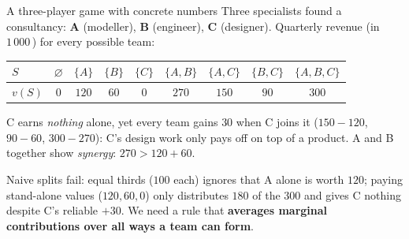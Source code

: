\documentclass[aspectratio=169,11pt]{beamer}
\begin{document}
\begin{frame}{A three-player game with concrete numbers}
  Three specialists found a consultancy: \textbf{A} (modeller), \textbf{B}
  (engineer), \textbf{C} (designer). Quarterly revenue (in $1\,000$\,\texteuro)
  for every possible team:
  \begin{numexample}
    \begin{center}
    \begin{tabular}{@{}lcccccccc@{}}
      \toprule
      $S$ & $\varnothing$ & $\{A\}$ & $\{B\}$ & $\{C\}$ & $\{A,B\}$ & $\{A,C\}$ & $\{B,C\}$ & $\{A,B,C\}$ \\
      \midrule
      $v(S)$ & $0$ & $120$ & $60$ & $0$ & $270$ & $150$ & $90$ & $300$ \\
      \bottomrule
    \end{tabular}
    \end{center}
    C earns \emph{nothing} alone, yet every team gains $30$ when C joins it
    ($150-120$, $90-60$, $300-270$): C's design work only pays off on top of a
    product. A and B together show \emph{synergy}: $270 > 120+60$.
  \end{numexample}
  \begin{takeaway}
    Naive splits fail: equal thirds ($100$ each) ignores that A alone is worth
    $120$; paying stand-alone values ($120,60,0$) only distributes $180$ of the
    $300$ and gives C nothing despite C's reliable $+30$. We need a rule that
    \textbf{averages marginal contributions over all ways a team can form}.
  \end{takeaway}
\end{frame}
\end{document}
